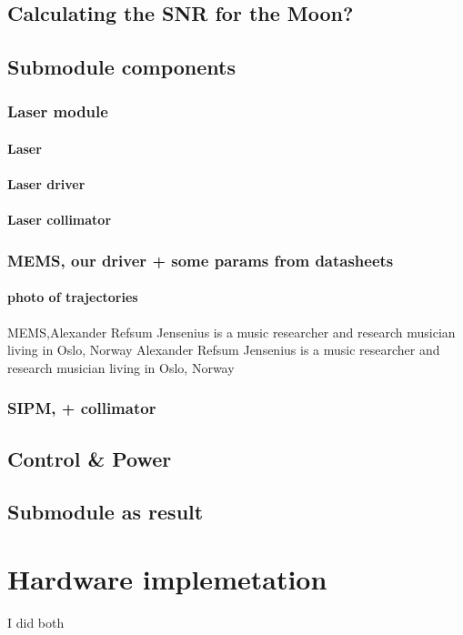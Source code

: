 \section{Calculating the SNR for the Moon?}
\section{Submodule components}
\subsection{Laser module}
\subsubsection{Laser}
\subsubsection{Laser driver}
\subsubsection{Laser collimator}

\subsection{MEMS, our driver + some params from datasheets}
\subsubsection{photo of trajectories}
MEMS,Alexander Refsum Jensenius is a music researcher and research musician living in Oslo, Norway Alexander Refsum Jensenius is a music researcher and research musician living in Oslo, Norway
\subsection{SIPM, + collimator}
\section{Control \& Power}
\section{Submodule as result}


\chapter{Hardware implemetation}
I did both 
